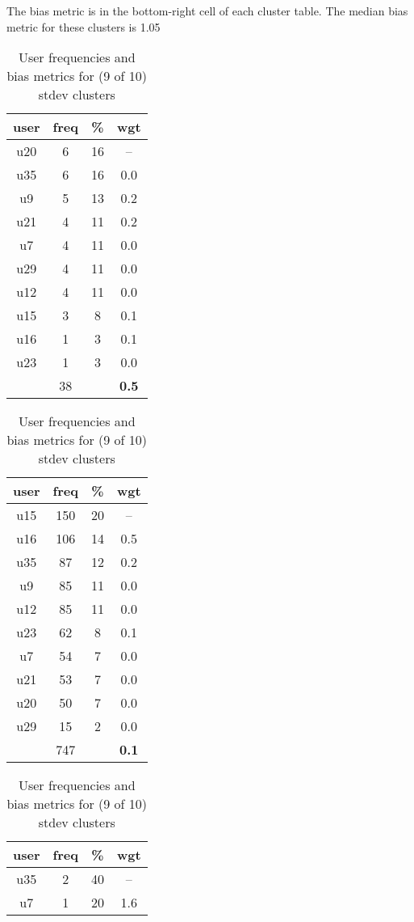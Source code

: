\begin{appendices}
\begin{table}
\centering
\caption{User frequencies and bias metrics for (9 of 10) stdev clusters}
{\small The bias metric is in the bottom-right cell of each cluster table. The median bias metric for these clusters is 1.05 \\}
\bigskip
\begin{tabular}{ |c|c|c|c| }
	\hline
	\textbf{user} & \textbf{freq} & \textbf{\%} & \textbf{wgt} \\
	\hline
	u20 & 6 & 16 & -- \\
	u35 & 6 & 16 & 0.0 \\
	u9 & 5 & 13 & 0.2 \\
	u21 & 4 & 11 & 0.2 \\
	u7 & 4 & 11 & 0.0 \\
	u29 & 4 & 11 & 0.0 \\
	u12 & 4 & 11 & 0.0 \\
	u15 & 3 & 8 & 0.1 \\
	u16 & 1 & 3 & 0.1 \\
	u23 & 1 & 3 & 0.0 \\
	 & 38 & & \textbf{0.5} \\
	\hline
\end{tabular}
\begin{tabular}{ |c|c|c|c| }
	\hline
	\textbf{user} & \textbf{freq} & \textbf{\%} & \textbf{wgt} \\
	\hline
	u15 & 150 & 20 & -- \\
	u16 & 106 & 14 & 0.5 \\
	u35 & 87 & 12 & 0.2 \\
	u9 & 85 & 11 & 0.0 \\
	u12 & 85 & 11 & 0.0 \\
	u23 & 62 & 8 & 0.1 \\
	u7 & 54 & 7 & 0.0 \\
	u21 & 53 & 7 & 0.0 \\
	u20 & 50 & 7 & 0.0 \\
	u29 & 15 & 2 & 0.0 \\
	 & 747 & & \textbf{0.1} \\
	\hline
\end{tabular}
\begin{tabular}{ |c|c|c|c| }
	\hline
	\textbf{user} & \textbf{freq} & \textbf{\%} & \textbf{wgt} \\
	\hline
	u35 & 2 & 40 & -- \\
	u7 & 1 & 20 & 1.6 \\

\end{tabular}
\end{table}
\end{appendices}
